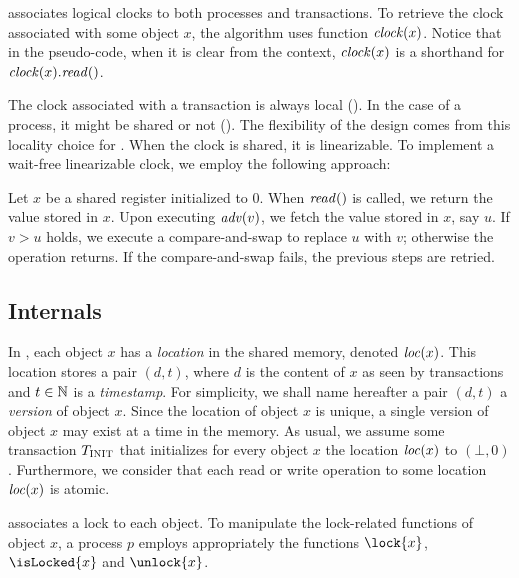  associates logical clocks to both processes and transactions.
To retrieve the clock associated with some object $x$, the algorithm uses function $\clockOf{x}$.
Notice that in the pseudo-code, when it is clear from the context, $\clockOf{x}$ is a shorthand for $\clockOf{x}.\mathit{read}()$.

The clock associated with a transaction is always local ().
In the case of a process, it might be shared or not ().
The flexibility of the design comes from this locality choice for .
When the clock is shared, it is linearizable.
To implement a wait-free linearizable clock, we employ the following approach:
\begin{construction}
  Let $x$ be a shared register initialized to $0$.
  When $\cread$ is called, we return the value stored in $x$.
  Upon executing $\cadv(v)$, we fetch the value stored in $x$, say $u$.
  If $v > u$ holds, we execute a compare-and-swap to replace $u$ with $v$; 
  otherwise the operation returns.
  If the compare-and-swap fails, the previous steps are retried.
\end{construction}



\subsection{Internals}

In , each object $x$ has a \emph{location} in the shared memory, denoted $\locationOf{x}$.
This location stores a pair $(d,t)$, where $d$ is the content of $x$ as seen by transactions and $t \in \naturalSet$ is a \emph{timestamp}.
For simplicity, we shall name hereafter a pair $(d,t)$ a \emph{version} of object $x$.
Since the location of object $x$ is unique, a single version of object $x$ may exist at a time in the memory.
As usual, we assume some transaction $\transInit$ that initializes for every object $x$ the location $\locationOf{x}$ to $(\bot,0)$.
Furthermore, we consider that each read or write operation to some location $\locationOf{x}$ is atomic.

 associates a lock to each object.
To manipulate the lock-related functions of object $x$, 
a process $p$ employs appropriately the functions $\lock{x}$, $\isLocked{x}$ and $\unlock{x}$.

